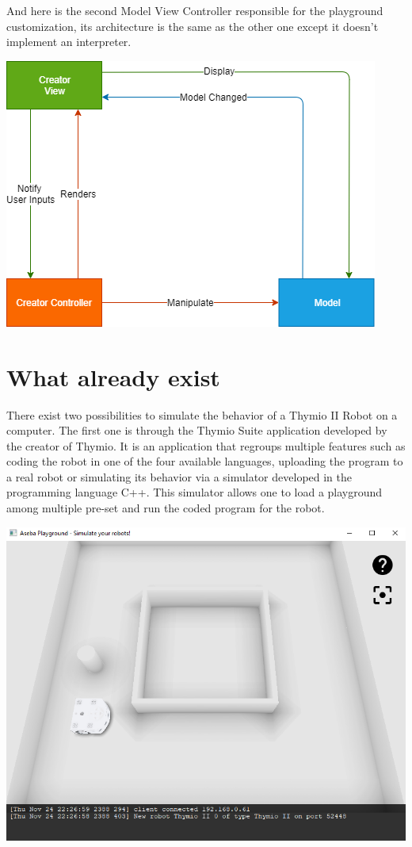 \documentclass{scrbook}
\begin{document}
And here is the second Model View Controller responsible for the playground customization, its architecture is the same as the other one except it doesn't implement an interpreter.
\begin{center}
  \includegraphics[width=\textwidth]{./architecture_proposal-Page-2}
\end{center}


\chapter{What already exist} 

There exist two possibilities to simulate the behavior of a Thymio II Robot on a computer. 
The first one is through the Thymio Suite application developed by the creator of Thymio. 
It is an application that regroups multiple features such as coding the robot in one of the four available languages, 
uploading the program to a real robot or simulating its behavior via a simulator developed in the programming language C++. 
This simulator allows one to load a playground among multiple pre-set and run the coded program for the robot.

\begin{center}
  \includegraphics[width=\textwidth]{./suite_simulator}
\end{center}
\end{document}
